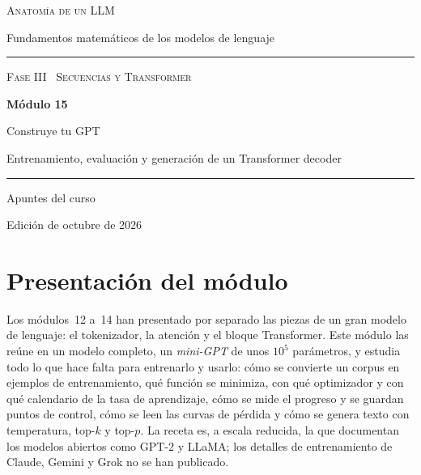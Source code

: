 \documentclass[11pt,a4paper,twoside,openany]{book}
\begin{document}
\frontmatter
\begin{titlepage}
\centering
\vspace*{2.5cm}
{\large\scshape Anatomía de un LLM}\par
\vspace{0.4cm}
{\normalsize Fundamentos matemáticos de los modelos de lenguaje}\par
\vspace{2.2cm}
\rule{\textwidth}{0.8pt}\par\vspace{0.5cm}
{\small\scshape Fase III \textperiodcentered\ Secuencias y Transformer}\par\vspace{0.3cm}
{\Huge\bfseries Módulo 15\par}\vspace{0.3cm}
{\LARGE Construye tu GPT\par}
\vspace{0.2cm}
{\large Entrenamiento, evaluación y generación de un Transformer decoder\par}
\vspace{0.5cm}\rule{\textwidth}{0.4pt}\par
\vspace{1.6cm}
{\large Apuntes del curso}\par
\vfill
{\small Edición de octubre de 2026}\par
\end{titlepage}

\chapter*{Presentación del módulo}

Los módulos~12 a~14 han presentado por separado las piezas de un gran modelo de lenguaje: el tokenizador, la atención y el bloque Transformer. Este módulo las reúne en un modelo completo, un \emph{mini-GPT} de unos $10^{5}$ parámetros, y estudia todo lo que hace falta para entrenarlo y usarlo: cómo se convierte un corpus en ejemplos de entrenamiento, qué función se minimiza, con qué optimizador y con qué calendario de la tasa de aprendizaje, cómo se mide el progreso y se guardan puntos de control, cómo se leen las curvas de pérdida y cómo se genera texto con temperatura, top-$k$ y top-$p$. La receta es, a escala reducida, la que documentan los modelos abiertos como GPT-2 y LLaMA; los detalles de entrenamiento de Claude, Gemini y Grok no se han publicado.
\end{document}
